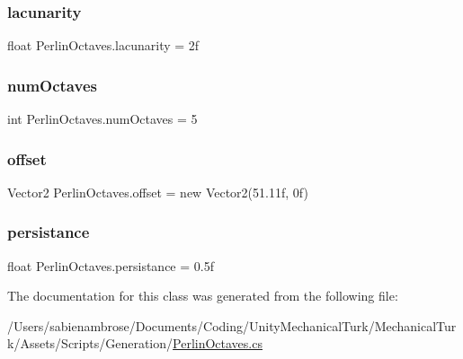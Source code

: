 \subsubsection{\texorpdfstring{lacunarity}{lacunarity}}
{\footnotesize\ttfamily float Perlin\+Octaves.\+lacunarity = 2f}

\mbox{\label{class_perlin_octaves_a611e17877eb36a3bdb546feae4d512cf}} 
\subsubsection{\texorpdfstring{num\+Octaves}{numOctaves}}
{\footnotesize\ttfamily int Perlin\+Octaves.\+num\+Octaves = 5}

\mbox{\label{class_perlin_octaves_a86b7b4fa2c1f94e01a37748511ddb8ee}} 
\subsubsection{\texorpdfstring{offset}{offset}}
{\footnotesize\ttfamily Vector2 Perlin\+Octaves.\+offset = new Vector2(51.\+11f, 0f)}

\mbox{\label{class_perlin_octaves_a0568ba2145fef1efb6bb137df4055a8a}} 
\subsubsection{\texorpdfstring{persistance}{persistance}}
{\footnotesize\ttfamily float Perlin\+Octaves.\+persistance = 0.\+5f}



The documentation for this class was generated from the following file\+:\begin{DoxyCompactItemize}
\item 
/\+Users/sabienambrose/\+Documents/\+Coding/\+Unity\+Mechanical\+Turk/\+Mechanical\+Turk/\+Assets/\+Scripts/\+Generation/\mbox{\hyperlink{_perlin_octaves_8cs}{Perlin\+Octaves.\+cs}}\end{DoxyCompactItemize}
